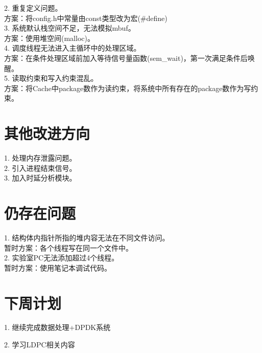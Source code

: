 \documentclass{article}
\begin{document}
2. 重复定义问题。\\
方案：将config.h中常量由const类型改为宏(\#define)\\

3. 系统默认栈空间不足，无法模拟mbuf。\\
方案：使用堆空间(malloc)。\\

4. 调度线程无法进入主循环中的处理区域。\\
方案：在条件处理区域前加入等待信号量函数(sem\_wait)，第一次满足条件后唤醒。\\

5. 读取约束和写入约束混乱。\\
方案：将Cache中package数作为读约束，将系统中所有存在的package数作为写约束。\\

\section{其他改进方向}
1. 处理内存泄露问题。\\

2. 引入进程结束信号。\\

3. 加入时延分析模块。\\

\section{仍存在问题}
1. 结构体内指针所指的堆内容无法在不同文件访问。\\
暂时方案：各个线程写在同一个文件中。\\

2. 实验室PC无法添加超过4个线程。\\
暂时方案：使用笔记本调试代码。\\

\section{下周计划}
1. 继续完成数据处理+DPDK系统

2. 学习LDPC相关内容
\end{document}
